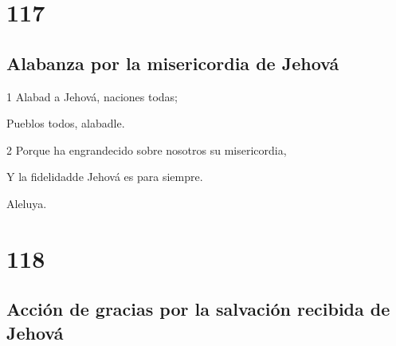 \chapter{117}

\section*{Alabanza por la misericordia de Jehová}

\par 1 Alabad a Jehová, naciones todas;
\par Pueblos todos, alabadle.
\par 2 Porque ha engrandecido sobre nosotros su misericordia,
\par Y la fidelidadde Jehová es para siempre.
\par Aleluya.

\chapter{118}

\section*{Acción de gracias por la salvación recibida de Jehová}

